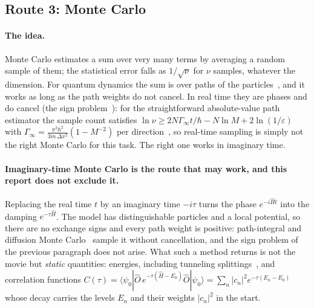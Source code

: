 \subsection{Route 3: Monte Carlo}
\label{sec:mc}

\paragraph{The idea.}
Monte Carlo estimates a sum over very many terms by averaging a random sample of them; the statistical error falls as $1/\sqrt\nu$ for $\nu$ samples, whatever the dimension. For quantum dynamics the sum is over paths of the particles~\cite{ceperley1980}, and it works as long as the path weights do not cancel. In real time they are phases and do cancel (the sign problem~\cite{troyer2005,muhlbacher2008}): for the straightforward absolute-value path estimator the sample count satisfies $\ln\nu\ge2N\Gamma_\infty t/\hbar-N\ln M+2\ln(1/\varepsilon)$ with $\Gamma_\infty=\frac{\pi^2\hbar^2}{3m\,\Delta x^2}(1-M^{-2})$ per direction~\cite{trefethen2000}, so real-time sampling is simply not the right Monte Carlo for this task. The right one works in imaginary time.

\paragraph{Imaginary-time Monte Carlo is the route that may work, and this report does not exclude it.} Replacing the real time $t$ by an imaginary time $-i\tau$ turns the phase $e^{-i\hat Ht}$ into the damping $e^{-\tau\hat H}$. The model has distinguishable particles and a local potential, so there are no exchange signs and every path weight is positive: path-integral and diffusion Monte Carlo~\cite{ceperley1980,anderson1975} sample it without cancellation, and the sign problem of the previous paragraph does not arise. What such a method returns is not the movie but \emph{static} quantities: energies, including tunneling splittings~\cite{sindzingre1989,richardson2011}, and correlation functions $C(\tau)=\langle\psi_0|\hat O\,e^{-\tau(\hat H-E_0)}\hat O|\psi_0\rangle=\sum_n|c_n|^2e^{-\tau(E_n-E_0)}$ whose decay carries the levels $E_n$ and their weights $|c_n|^2$ in the start.

